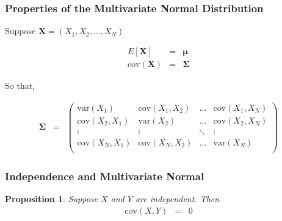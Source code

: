 \documentclass[handout]{beamer}
\newtheorem{prop}{Proposition}
\numberwithin{equation}{section}
\begin{document}
\begin{frame}
\frametitle{Properties of the Multivariate Normal Distribution}

Suppose $\boldsymbol{X} = (X_{1}, X_{2}, \hdots, X_{N} ) $

\begin{eqnarray}
E[\boldsymbol{X} ] & = &  \boldsymbol{\mu}\nonumber \\
\text{cov}(\boldsymbol{X} ) & = & \boldsymbol{\Sigma} \nonumber 
\end{eqnarray}

So that, 

\begin{eqnarray}
\boldsymbol{\Sigma}  & = & \begin{pmatrix} 
\text{var}(X_{1}) & \text{cov}(X_{1}, X_{2}) & \hdots & \text{cov}(X_{1}, X_{N}) \\
\text{cov}(X_{2}, X_{1}) & \text{var}(X_{2}) & \hdots & \text{cov}(X_{2}, X_{N} ) \\
\vdots & \vdots & \ddots & \vdots \\
\text{cov}(X_{N}, X_{1} ) & \text{cov}(X_{N}, X_{2} ) & \hdots & \text{var}(X_{N} ) \\
\end{pmatrix} \nonumber 
\end{eqnarray}


\end{frame}


























\begin{frame}
\frametitle{Independence and Multivariate Normal}

\begin{prop}
Suppose $X$ and $Y$ are independent.  Then 
\begin{eqnarray}
\text{cov}(X, Y) & = & 0 \nonumber 
\end{eqnarray}

\end{prop}



\end{frame}
\end{document}
